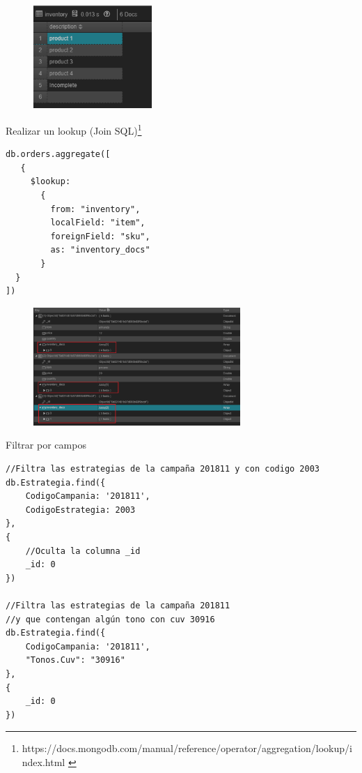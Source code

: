 \documentclass[a4paper,11pt]{paper}
\begin{document}
\newpage
\begin{figure}[!h]
\centering
\includegraphics[width=0.4\textwidth]{imgs/FiltroDescripcion2.png}
\end{figure}

Realizar un lookup (Join SQL)\footnote{https://docs.mongodb.com/manual/reference/operator/aggregation/lookup/index.html \cite{doc}}


\begin{verbatim}
db.orders.aggregate([
   {
     $lookup:
       {
         from: "inventory",
         localField: "item",
         foreignField: "sku",
         as: "inventory_docs"
       }
  }
])
\end{verbatim}

\begin{figure}[!h]
\centering
\includegraphics[width=0.7\textwidth]{imgs/ConsultaJoin.png}
\end{figure}

\newpage
Filtrar por campos

\begin{verbatim}
//Filtra las estrategias de la campaña 201811 y con codigo 2003
db.Estrategia.find({
    CodigoCampania: '201811',
    CodigoEstrategia: 2003
},
{
    //Oculta la columna _id
    _id: 0
})

//Filtra las estrategias de la campaña 201811 
//y que contengan algún tono con cuv 30916
db.Estrategia.find({
    CodigoCampania: '201811',
    "Tonos.Cuv": "30916"
},
{
    _id: 0
})
\end{verbatim}
\end{document}
